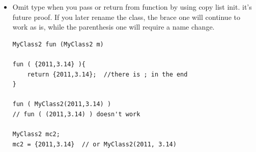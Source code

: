 \documentclass[a4paper,11pt,twoside]{book}
\begin{document}
\begin{itemize}
\item Omit type when you pass or return from function by using copy list init. it's future proof. If you later rename the class, the brace one will continue to work as is, while the parenthesis one will require a name change.

\begin{lstlisting}
MyClass2 fun (MyClass2 m) 

fun ( {2011,3.14} ){
	return {2011,3.14};  //there is ; in the end
}

fun ( MyClass2(2011,3.14) ) 
// fun ( (2011,3.14) ) doesn't work

MyClass2 mc2;
mc2 = {2011,3.14}  // or MyClass2(2011, 3.14)
\end{lstlisting}


\end{itemize}
\end{document}
